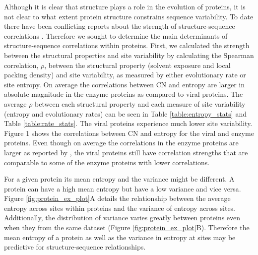 \documentclass[12pt]{article}
\begin{document}
Although it is clear that structure plays a role in the evolution of proteins, it is not clear to what extent protein structure constrains sequence variability. To date there have been conflicting reports about the strength of structure-sequence correlations \citep{Yehetal2014b, Shahmoradietal2014}. Therefore we sought to determine the main determinants of structure-sequence correlations within proteins. First, we calculated the strength between the structural properties and site variability by calculating the Spearman correlation, $\rho$,  between the structural property (solvent exposure and local packing density) and site variability, as measured by either evolutionary rate or site entropy. On average the correlations between CN and entropy are larger in absolute magnitude in the enzyme proteins as compared to viral proteins. The average $\rho$ between each structural property and each measure of site variability (entropy and evolutionary rates) can be seen in Table \ref{table:entropy_stats}  and Table \ref{table:rate_stats}. The viral proteins experience much lower site variability. Figure 1 shows the correlations between CN and entropy for the viral and enzyme proteins. Even though on average the correlations in the enzyme proteins are larger as reported by \cite{Yehetal2014a}, the viral proteins still have correlation strengths that are comparable to some of the enzyme proteins with lower correlations. 

\indent For a given protein its mean entropy and the variance might be different. A protein can have a high mean entropy but have a low variance and vice versa. Figure \ref{fig:protein_ex_plot}A details the relationship between the average entropy across sites within proteins and the variance of entropy across sites. Additionally, the distribution of variance varies greatly between proteins even when they from the same dataset (Figure \ref{fig:protein_ex_plot}B). Therefore the mean entropy of a protein as well as the variance in entropy at sites may be predictive for structure-sequence relationships.
\end{document}
